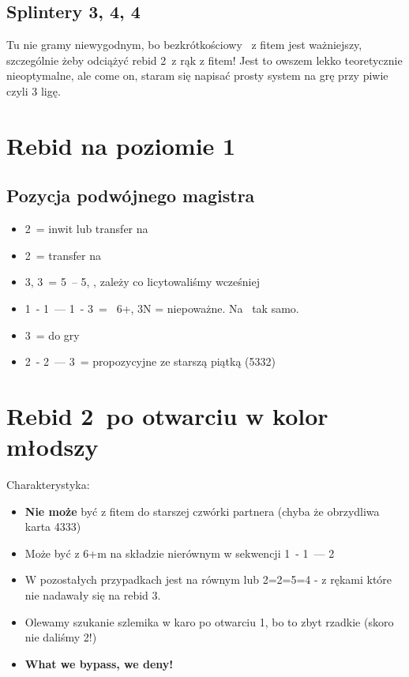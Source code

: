 \documentclass[12pt, a4paper]{article}
\begin{document}
\subsection*{Splintery 3\spades, 4\clubs, 4\diams}
Tu nie gramy niewygodnym, bo bezkrótkościowy \gf\ z fitem jest ważniejszy, szczególnie żeby odciążyć rebid 2\nt\ z rąk z fitem!
Jest to owszem lekko teoretycznie nieoptymalne, ale come on, staram się napisać prosty system na grę przy piwie czyli 3 ligę.



\pagebreak
\section{Rebid na poziomie 1}
\subsection*{Pozycja podwójnego magistra}
\begin{itemize}
    \item 2\clubs\ = inwit lub transfer na \diams\
    \item 2\nt\ = transfer na \clubs\
    \item 3\clubs, 3\diams\ = 5\minor\ -- 5\major, \gf, zależy co licytowaliśmy wcześniej
    \item 1\clubs\ - 1\spades\ --- 1\nt\ - 3\spades\ = \gf\ 6+\spades, 3N = niepoważne. Na \hearts\ tak samo.
    \item 3\nt\ = do gry
    \item 2\clubs\ - 2\diams\ --- 3\nt\ = propozycyjne ze starszą piątką (5332) \imp
\end{itemize}



\pagebreak
\section{Rebid 2\ntx\ po otwarciu w kolor młodszy}
Charakterystyka:
\begin{itemize}
    \item \textbf{Nie może} być z fitem do starszej czwórki partnera (chyba że obrzydliwa karta 4333)
    \item Może być z 6+m na składzie nierównym w sekwencji 1\diams\ - 1\hearts\ --- 2\nt \imp
    \item W pozostałych przypadkach jest na równym lub 2=2=5=4 - z rękami które nie nadawały się na rebid 3\clubs.
    \item Olewamy szukanie szlemika w karo po otwarciu 1\clubs, bo to zbyt rzadkie (skoro nie daliśmy 2\nt!)
    \item \textbf{What we bypass, we deny!}
\end{itemize}
\end{document}
